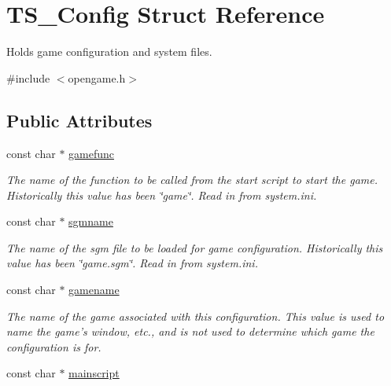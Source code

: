 \hypertarget{structTS__Config}{\section{T\-S\-\_\-\-Config Struct Reference}
\label{structTS__Config}
}


Holds game configuration and system files.  




{\ttfamily \#include $<$opengame.\-h$>$}

\subsection*{Public Attributes}
\begin{DoxyCompactItemize}
\item 
\hypertarget{structTS__Config_a55a075f4c7cdd81e247fb48266f03f4e}{const char $\ast$ \hyperlink{structTS__Config_a55a075f4c7cdd81e247fb48266f03f4e}{gamefunc}}\label{structTS__Config_a55a075f4c7cdd81e247fb48266f03f4e}

\begin{DoxyCompactList}\small\item\em The name of the function to be called from the start script to start the game. Historically this value has been \char`\"{}game\char`\"{}. Read in from {\itshape system.\-ini}. \end{DoxyCompactList}\item 
\hypertarget{structTS__Config_a0317b64b359ed859e2196d2f0ab80a44}{const char $\ast$ \hyperlink{structTS__Config_a0317b64b359ed859e2196d2f0ab80a44}{sgmname}}\label{structTS__Config_a0317b64b359ed859e2196d2f0ab80a44}

\begin{DoxyCompactList}\small\item\em The name of the sgm file to be loaded for game configuration. Historically this value has been \char`\"{}game.\-sgm\char`\"{}. Read in from {\itshape system.\-ini}. \end{DoxyCompactList}\item 
\hypertarget{structTS__Config_a95d20b117aa567c0999648461ae674a0}{const char $\ast$ \hyperlink{structTS__Config_a95d20b117aa567c0999648461ae674a0}{gamename}}\label{structTS__Config_a95d20b117aa567c0999648461ae674a0}

\begin{DoxyCompactList}\small\item\em The name of the game associated with this configuration. This value is used to name the game's window, etc., and is not used to determine which game the configuration is for. \end{DoxyCompactList}\item 
\hypertarget{structTS__Config_acdb1ac5a673f6affdb8a7d1a5d99891e}{const char $\ast$ \hyperlink{structTS__Config_acdb1ac5a673f6affdb8a7d1a5d99891e}{mainscript}}\label{structTS__Config_acdb1ac5a673f6affdb8a7d1a5d99891e}


\end{DoxyCompactItemize}

